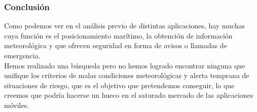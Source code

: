 \begin{enumerate}
\subsubsection{Conclusión}

Como podemos ver en el análisis previo de distintas aplicaciones, hay muchas cuya función es el posicionamiento marítimo, la obtención de información meteorológica y  que ofrecen seguridad en forma de avisos o llamadas de emergencia.
\\
Hemos realizado una búsqueda pero no hemos logrado encontrar ninguna que unifique los criterios de malas condiciones meteorológicas y alerta temprana de situaciones de riesgo, que es el objetivo que pretendemos conseguir, lo que creemos que podría hacerse un hueco en el saturado mercado de las aplicaciones móviles.
\\
\end{enumerate}
 
